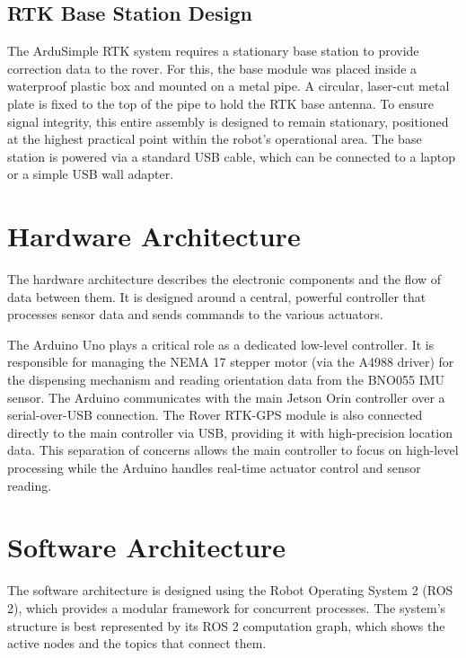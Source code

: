 \subsection{RTK Base Station Design}
\label{ssec:rtk_base_design}
The ArduSimple RTK system requires a stationary base station to provide correction data to the rover. For this, the base module was placed inside a waterproof plastic box and mounted on a metal pipe. A circular, laser-cut metal plate is fixed to the top of the pipe to hold the RTK base antenna. To ensure signal integrity, this entire assembly is designed to remain stationary, positioned at the highest practical point within the robot's operational area. The base station is powered via a standard USB cable, which can be connected to a laptop or a simple USB wall adapter.

\section{Hardware Architecture}
\label{sec:hardware_architecture}
The hardware architecture describes the electronic components and the flow of data between them. It is designed around a central, powerful controller that processes sensor data and sends commands to the various actuators.

The Arduino Uno plays a critical role as a dedicated low-level controller. It is responsible for managing the NEMA 17 stepper motor (via the A4988 driver) for the dispensing mechanism and reading orientation data from the BNO055 IMU sensor. The Arduino communicates with the main Jetson Orin controller over a serial-over-USB connection. The Rover RTK-GPS module is also connected directly to the main controller via USB, providing it with high-precision location data. This separation of concerns allows the main controller to focus on high-level processing while the Arduino handles real-time actuator control and sensor reading.


\section{Software Architecture}
\label{sec:software_architecture}
The software architecture is designed using the Robot Operating System 2 (ROS 2), which provides a modular framework for concurrent processes. The system's structure is best represented by its ROS 2 computation graph, which shows the active nodes and the topics that connect them.

